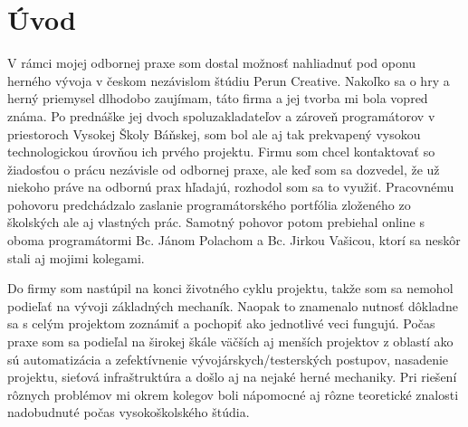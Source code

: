 \documentclass[slovak,bachelorpractice,dept460,male,csharp,cpdeclaration]{diploma}
\begin{document}
\MakeTitlePages

\section{Úvod}
\label{sec:Introduction}
V rámci mojej odbornej praxe som dostal možnosť nahliadnuť pod oponu herného vývoja v českom nezávislom štúdiu Perun Creative. Nakoľko sa o hry a herný priemysel dlhodobo zaujímam, táto firma a jej tvorba mi bola vopred známa. Po prednáške jej dvoch spoluzakladateľov a zároveň programátorov v priestoroch Vysokej Školy Báňskej, som bol ale aj tak prekvapený vysokou technologickou úrovňou ich prvého projektu. Firmu som chcel kontaktovať so žiadosťou o prácu nezávisle od odbornej praxe, ale keď som sa dozvedel, že už niekoho práve na odbornú prax hľadajú, rozhodol som sa to využiť. Pracovnému pohovoru predchádzalo zaslanie programátorského portfólia zloženého zo školských ale aj vlastných prác. Samotný pohovor potom prebiehal online s oboma programátormi Bc. Jánom Polachom a Bc. Jirkou Vašicou, ktorí sa neskôr stali aj mojimi kolegami.

Do firmy som nastúpil na konci životného cyklu projektu, takže som sa nemohol podieľať na vývoji základných mechaník. Naopak to znamenalo nutnosť dôkladne sa s celým projektom zoznámiť a pochopiť ako jednotlivé veci fungujú. Počas praxe som sa podieľal na širokej škále väčších aj menších projektov z oblastí ako sú automatizácia a zefektívnenie \mbox{vývojárskych/testerských} postupov, nasadenie projektu, sieťová infraštruktúra a došlo aj na nejaké herné mechaniky. Pri riešení rôznych problémov mi okrem kolegov boli nápomocné aj rôzne teoretické znalosti nadobudnuté počas vysokoškolského štúdia.
\end{document}
